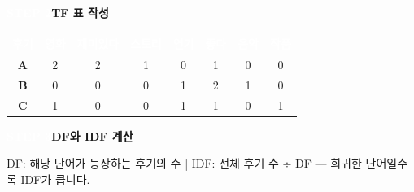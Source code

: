 \documentclass[a4paper,11pt]{article}
\begin{document}
\noindent
\colorbox{badgegray}{\textcolor{white}{\small\bfseries STEP 2}}\enspace\textbf{TF 표 작성}
\par\vspace{1mm}
\begin{center}
\renewcommand{\arraystretch}{1.4}
\begin{tabular}{|c|c|c|c|c|c|c|c|}
\hline
\cellcolor{badgegray}\textcolor{white}{\small\bfseries 후기} & \cellcolor{badgegray}\textcolor{white}{\small\bfseries 영화} & \cellcolor{badgegray}\textcolor{white}{\small\bfseries 재미있다} & \cellcolor{badgegray}\textcolor{white}{\small\bfseries 스토리} & \cellcolor{badgegray}\textcolor{white}{\small\bfseries 연기} & \cellcolor{badgegray}\textcolor{white}{\small\bfseries 좋다} & \cellcolor{badgegray}\textcolor{white}{\small\bfseries 음악} & \cellcolor{badgegray}\textcolor{white}{\small\bfseries 작품} \\ \hline
\cellcolor{stepbg}\bfseries A & \cellcolor{stepbg} 2 & \cellcolor{stepbg} 2 & \cellcolor{stepbg} 1 & \cellcolor{answerbg} 0 & \cellcolor{answerbg} 1 & \cellcolor{answerbg} 0 & \cellcolor{answerbg} 0 \\ \hline
\cellcolor{stepbg}\bfseries B & \cellcolor{answerbg} 0 & \cellcolor{answerbg} 0 & \cellcolor{answerbg} 0 & \cellcolor{answerbg} 1 & \cellcolor{answerbg} 2 & \cellcolor{answerbg} 1 & \cellcolor{answerbg} 0 \\ \hline
\cellcolor{stepbg}\bfseries C & \cellcolor{answerbg} 1 & \cellcolor{answerbg} 0 & \cellcolor{answerbg} 0 & \cellcolor{answerbg} 1 & \cellcolor{answerbg} 1 & \cellcolor{answerbg} 0 & \cellcolor{answerbg} 1 \\ \hline
\end{tabular}
\end{center}
\par\vspace{3mm}
\noindent
\colorbox{badgegray}{\textcolor{white}{\small\bfseries STEP 3}}\enspace\textbf{DF와 IDF 계산}
\par\vspace{1mm}
\begin{tcolorbox}[colback=stepbg,colframe=gray!50,boxrule=0.3pt,left=5pt,right=5pt,top=2pt,bottom=2pt]
\noindent\small DF: 해당 단어가 등장하는 후기의 수  |  IDF: 전체 후기 수 ÷ DF — 희귀한 단어일수록 IDF가 큽니다.\\
\end{tcolorbox}
\vspace{1mm}
\end{document}
